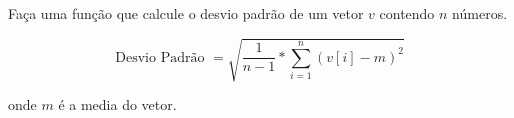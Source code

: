 
\question[10]

Faça uma função que calcule o desvio padrão de um vetor $v$ contendo $n$ números.

\begin{equation*}
	\text{Desvio Padrão }= \sqrt{\frac{1}{n-1}*\sum_{i=1}^{n}(v[i] - m)^2}
\end{equation*}

onde $m$ é a media do vetor.

